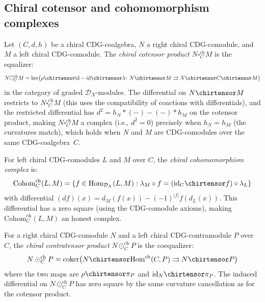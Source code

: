 \subsection{Chiral cotensor and cohomomorphism complexes}
\label{subsec:chiral-cotensor}

\begin{definition}\label{def:chiral-cotensor}
Let $(C, d, h)$ be a chiral CDG-coalgebra, $N$ a right chiral
CDG-comodule, and $M$ a left chiral CDG-comodule.  The
\emph{chiral cotensor product} $N \square_C^{\mathrm{ch}} M$ is
the equalizer:
\[
N \square_C^{\mathrm{ch}} M =
\ker\bigl(\rho \chirtensor \mathrm{id} - \mathrm{id} \chirtensor \lambda\colon
N \chirtensor M \rightrightarrows N \chirtensor C \chirtensor M\bigr)
\]
in the category of graded $\mathcal{D}_X$-modules.
The differential on $N \chirtensor M$ restricts to
$N \square_C^{\mathrm{ch}} M$ (this uses the compatibility of coactions
with differentials), and the restricted differential has
$d^2 = h_N \ast (-) - (-) \ast h_M$ on the cotensor product, making
$N \square_C^{\mathrm{ch}} M$ a complex (i.e., $d^2 = 0$) precisely
when $h_N = h_M$ (the curvatures match), which holds when $N$ and $M$
are CDG-comodules over the same CDG-coalgebra~$C$.
\end{definition}

\begin{definition}\label{def:chiral-cohom}
For left chiral CDG-comodules $L$ and $M$ over $C$, the
\emph{chiral cohomomorphism complex} is:
\[
\mathrm{Cohom}_C^{\mathrm{ch}}(L, M) =
\{f \in \mathrm{Hom}_{\mathcal{D}_X}(L, M) :
\lambda_M \circ f = (\mathrm{id}_C \chirtensor f) \circ \lambda_L\}
\]
with differential $(d f)(x) = d_M(f(x)) - (-1)^{|f|} f(d_L(x))$.
This differential has a zero square (using the CDG-comodule axioms),
making $\mathrm{Cohom}_C^{\mathrm{ch}}(L, M)$ an honest complex.
\end{definition}

\begin{definition}\label{def:chiral-contratensor}
For a right chiral CDG-comodule $N$ and a left chiral
CDG-contramodule $P$ over $C$, the \emph{chiral contratensor
product} $N \odot_C^{\mathrm{ch}} P$ is the coequalizer:
\[
N \odot_C^{\mathrm{ch}} P =
\mathrm{coker}\bigl(
N \chirtensor \mathrm{Hom}^{\mathrm{ch}}(C, P) \rightrightarrows N \chirtensor P
\bigr)
\]
where the two maps are
$\rho \chirtensor \pi_P$ and $\mathrm{id}_N \chirtensor \pi_P$.
The induced differential on $N \odot_C^{\mathrm{ch}} P$ has zero
square by the same curvature cancellation as for the cotensor product.
\end{definition}

